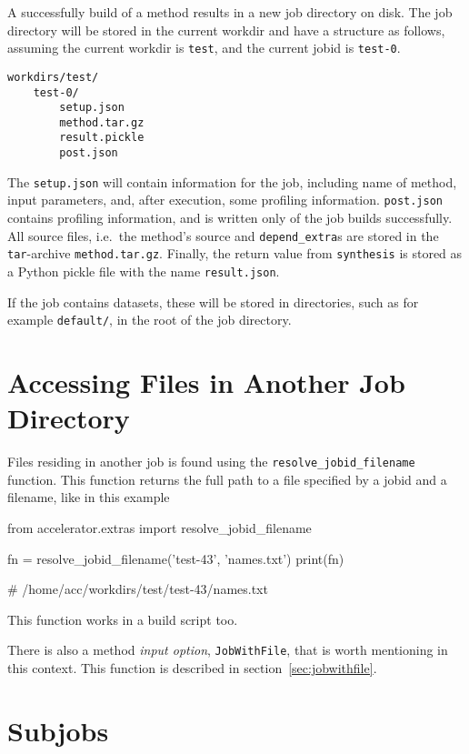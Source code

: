 A successfully build of a method results in a new job directory on
disk.  The job directory will be stored in the current workdir and
have a structure as follows, assuming the current workdir
is \texttt{test}, and the current jobid is \texttt{test-0}.
\begin{verbatim}
workdirs/test/
    test-0/
        setup.json
        method.tar.gz
        result.pickle
        post.json
\end{verbatim}
The \texttt{setup.json} will contain information for the job,
including name of method, input parameters, and, after execution, some
profiling information.  \texttt{post.json} contains profiling
information, and is written only of the job builds successfully.  All
source files, i.e.\ the method's source and \texttt{depend\_extra}s
are stored in the \texttt{tar}-archive \texttt{method.tar.gz}.
Finally, the return value from \texttt{synthesis} is stored as a
Python pickle file with the name \texttt{result.json}.

If the job contains datasets, these will be stored in directories,
such as for example \texttt{default/}, in the root of the job
directory.



\section{Accessing Files in Another Job Directory}
Files residing in another job is found using the
\texttt{resolve\_jobid\_filename} function.  This function returns the
full path to a file specified by a jobid and a filename, like in this
example
\begin{python}
from accelerator.extras import resolve_jobid_filename

fn = resolve_jobid_filename('test-43', 'names.txt')
print(fn)

# /home/acc/workdirs/test/test-43/names.txt
\end{python}
This function works in a build script too.

There is also a method \textsl{input option}, \texttt{JobWithFile}, that is
worth mentioning in this context.  This function is described in
section~\ref{sec:jobwithfile}.




\section{Subjobs}
\label{sec:subjobs}

